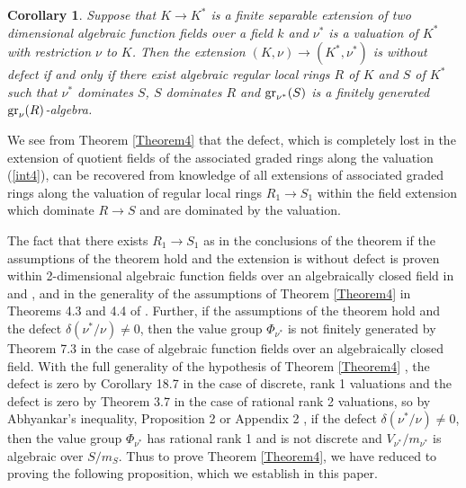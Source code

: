 \documentclass[11pt]{amsart}
\newtheorem{Corollary}[Theorem]{Corollary}
\begin{document}
\begin{Corollary}Suppose that $K\rightarrow K^*$ is a finite separable extension of two dimensional algebraic function fields over a field $k$ and  $\nu^*$ is a  valuation of $K^*$ with restriction $\nu$ to $K$. Then the extension $(K,\nu) \rightarrow (K^*,\nu^*)$ is without defect if and only if there exist  algebraic regular local rings $R$ of $K$ and $S$ of $K^*$ such that $\nu^*$ dominates $S$,  $S$ dominates $R$ and ${\rm gr}_{\nu^*}(S)$ is a finitely generated  ${\rm gr}_{\nu}(R)$-algebra.
\end{Corollary}



We  see from Theorem \ref{Theorem4} that the  defect, which is completely lost in the extension of quotient fields of the associated graded rings along the valuation (\ref{int4}), can be recovered from knowledge of all extensions of associated graded rings along the valuation of  regular local rings $R_1\rightarrow S_1$ within the field extension which dominate $R\rightarrow S$ and are dominated by the valuation.



The fact that there exists $R_1\rightarrow S_1$ as in the conclusions of the theorem if the assumptions of the theorem hold and the extension is without defect  is proven within 2-dimensional algebraic function fields over an algebraically closed field in \cite{GHK} and \cite{GK},  and in the generality of the assumptions of Theorem \ref{Theorem4} in Theorems 4.3 and 4.4 of \cite{C12}.
Further, if the assumptions of the theorem hold and the defect $\delta(\nu^*/\nu)\ne 0$, then the value group  $\Phi_{\nu^*}$ is not finitely generated  by Theorem 7.3 \cite{CP} in the case of algebraic function fields over an algebraically closed field. With  the full generality of the hypothesis  of Theorem \ref{Theorem4} , the defect is zero by  Corollary 18.7 \cite{E}
in the case of discrete, rank 1 valuations and the defect is zero by Theorem 3.7 \cite{C12} in the case of rational rank 2 valuations, so  by Abhyankar's inequality, Proposition 2 \cite{Ab1} or Appendix 2 \cite{ZS2}, if the defect  $\delta(\nu^*/\nu)\ne 0$, then the value group
$\Phi_{\nu^*}$ has rational rank 1 and is not discrete and $V_{\nu^*}/m_{\nu^*}$ is algebraic over $S/m_S$. Thus to prove Theorem \ref{Theorem4}, we have reduced to proving the following proposition, which we  establish in this paper.
\end{document}
